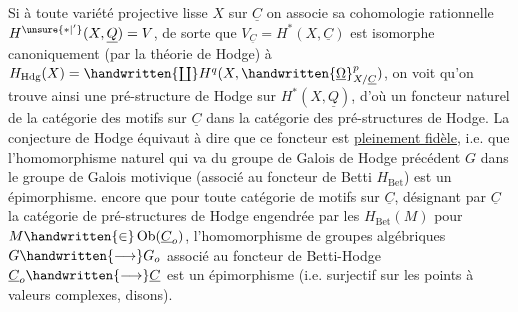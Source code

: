Si à toute variété projective lisse $X$ sur $\underline{C}$ on associe sa cohomologie rationnelle $H^{\unsure{*|'}}(X,\underline{Q})=V$, de sorte que $V_{\underline{C}}=H^*(X,\underline{C})$ est isomorphe canoniquement (par la théorie de Hodge) à $H_{\mathrm{Hdg}}(X)=\handwritten{\coprod}H^q(X,\handwritten{\underline{\Omega}}^p_{X/\underline{C}})$, on voit qu'on trouve ainsi une pré-structure de Hodge sur $H^*(X,\underline{Q})$, d'où un \inserted{$\unsure{\otimes|\Omega}$-}foncteur naturel de la catégorie des motifs sur $\underline{C}$ dans la catégorie des pré-structures de Hodge. La conjecture de Hodge  équivaut à dire que ce foncteur est \uline{pleinement fidèle}, i.e. que l'homomorphisme naturel qui va du groupe de Galois de Hodge précédent $G$ dans le groupe de Galois motivique (associé au \inserted{$\otimes$-}foncteur de Betti $H_{\mathrm{Bet}}$) est un épimorphisme.  encore que pour toute catégorie   de motifs sur $\underline{C}$, désignant par $\underline{C}$ la \inserted{$\otimes$-}catégorie de pré-structures de Hodge engendrée par  les $H_{\mathrm{Bet}}(M)$ pour $M\handwritten{\in}\operatorname{Ob}(\underline{C}_o)$, l'homomorphisme de groupes algébriques $G\handwritten{\longrightarrow}G_o$ associé au foncteur de Betti-Hodge $\underline{C}_o\handwritten{\longrightarrow}\underline{C}$ est un épimorphisme (i.e. surjectif sur les points à valeurs complexes, disons).

